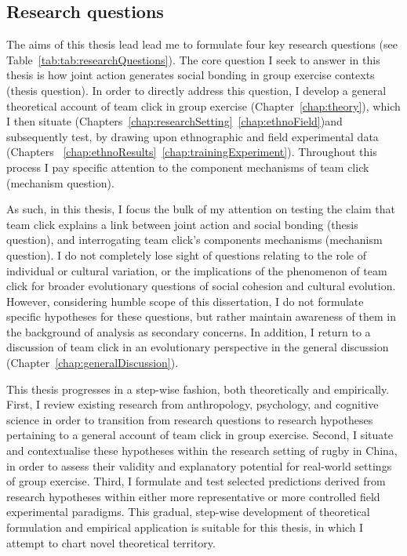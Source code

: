 \begin{CJK}{UTF8}{gbsn}
\subsection{Research questions}
The aims of this thesis lead lead me to formulate four key research questions  (see Table~\ref{tab:tab:researchQuestions}).  The core question I seek to answer in this thesis is how joint action generates social bonding in group exercise contexts (thesis question).  In order to directly address this question, I develop a general theoretical account of team click in group exercise (Chapter~\ref{chap:theory}), which I then situate (Chapters~\ref{chap:researchSetting}\nobreakdash~\ref{chap:ethnoField})and subsequently test, by drawing upon ethnographic and field experimental data (Chapters ~\ref{chap:ethnoResults}\nobreakdash~\ref{chap:trainingExperiment}).  Throughout this process I pay specific attention to the component mechanisms of team click (mechanism question).



As such, in this thesis,  I focus the bulk of my attention on testing the claim that team click explains a link between joint action and social bonding (thesis question), and interrogating team click's components mechanisms (mechanism question).   I do not completely lose sight of questions relating to the role of individual or cultural variation, or the implications of the phenomenon of team click for broader evolutionary questions of social cohesion and cultural evolution.  However, considering humble scope of this dissertation, I do not formulate specific hypotheses for these questions, but rather maintain awareness of them in the background of analysis as secondary concerns.  In addition, I return to a discussion of team click in an evolutionary perspective in the general discussion (Chapter~\ref{chap:generalDiscussion}).

This thesis progresses in a step-wise fashion, both theoretically and empirically.  First, I review existing research from anthropology, psychology, and cognitive science in order to transition from research questions to research hypotheses pertaining to a general account of team click in group exercise.  Second, I situate and contextualise these hypotheses within the research setting of rugby in China, in order to assess their validity and explanatory potential for real-world settings of group exercise.  Third, I formulate and test selected predictions derived from research hypotheses within either more representative or more controlled field experimental paradigms.
This gradual, step-wise development of theoretical formulation and empirical application is suitable for this thesis, in which I attempt to chart novel theoretical territory.



\end{CJK}
